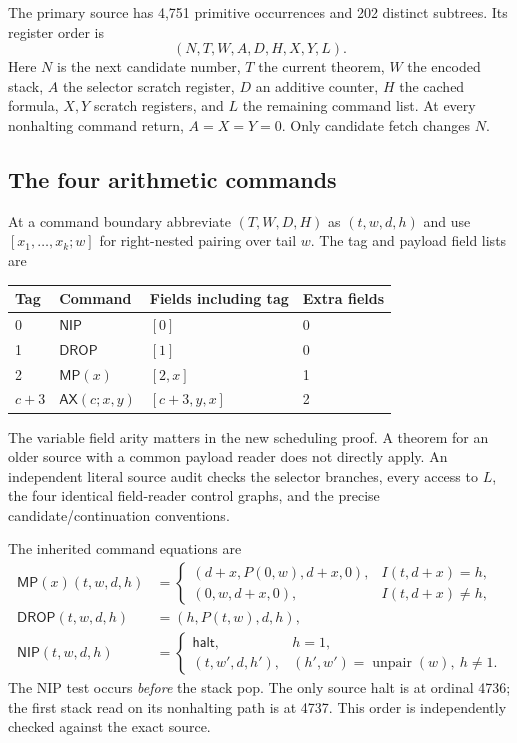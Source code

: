 \documentclass[11pt,letterpaper]{article}
\theoremstyle{definition}
\newcommand{\MP}{\mathsf{MP}}
\newcommand{\DROP}{\mathsf{DROP}}
\newcommand{\NIP}{\mathsf{NIP}}
\newcommand{\AX}{\mathsf{AX}}
\begin{document}
The primary source has 4,751 primitive occurrences and 202 distinct
subtrees.  Its register order is
\[
 (N,T,W,A,D,H,X,Y,L).
\]
Here $N$ is the next candidate number, $T$ the current theorem, $W$ the
encoded stack, $A$ the selector scratch register, $D$ an additive
counter, $H$ the cached formula, $X,Y$ scratch registers, and $L$ the
remaining command list.  At every nonhalting command return,
$A=X=Y=0$.  Only candidate fetch changes $N$.

\subsection{The four arithmetic commands}

At a command boundary abbreviate $(T,W,D,H)$ as $(t,w,d,h)$ and use
$[x_1,\ldots,x_k;w]$ for right-nested pairing over tail $w$.
The tag and payload field lists are
\begin{center}
\begin{tabular}{llll}
\toprule
Tag & Command & Fields including tag & Extra fields \\
\midrule
0 & $\NIP$ & $[0]$ & 0 \\
1 & $\DROP$ & $[1]$ & 0 \\
2 & $\MP(x)$ & $[2,x]$ & 1 \\
$c+3$ & $\AX(c;x,y)$ & $[c+3,y,x]$ & 2 \\
\bottomrule
\end{tabular}
\end{center}
The variable field arity matters in the new scheduling proof.  A theorem
for an older source with a common payload reader does not directly apply.
An independent literal source audit checks the selector branches, every
access to $L$, the four identical field-reader control graphs, and the
precise candidate/continuation conventions.

The inherited command equations are
\begin{align*}
 \MP(x)(t,w,d,h)&=
 \begin{cases}
 (d+x,P(0,w),d+x,0),& I(t,d+x)=h,\\
 (0,w,d+x,0),&I(t,d+x)\ne h,
 \end{cases}\\
 \DROP(t,w,d,h)&=(h,P(t,w),d,h),\\
 \NIP(t,w,d,h)&=
 \begin{cases}
 \mathsf{halt},&h=1,\\
 (t,w',d,h'),&(h',w')=\operatorname{unpair}(w),\ h\ne1.
 \end{cases}
\end{align*}
The NIP test occurs \emph{before} the stack pop.  The only source halt
is at ordinal 4736; the first stack read on its nonhalting path is at
4737.  This order is independently checked against the exact source.
\end{document}
